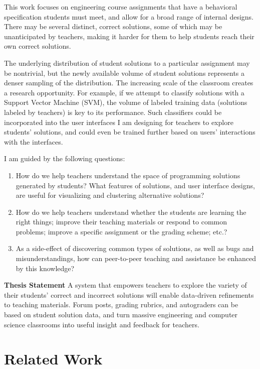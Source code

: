 \documentclass{sigchi}
\begin{document}
This work focuses on engineering course assignments that have a behavioral specification students must meet, and allow for a broad range of internal designs. There may be several distinct, correct solutions, some of which may be unanticipated by teachers, making it harder for them to help students reach their own correct solutions. 

The underlying distribution of student solutions to a particular assignment may be nontrivial, but the newly available volume of student solutions represents a denser sampling of the distribution. The increasing scale of the classroom creates a research opportunity. For example, if we attempt to classify solutions with a Support Vector Machine (SVM), the volume of labeled training data (solutions labeled by teachers) is key to its performance. Such classifiers could be incorporated into the user interfaces I am designing for teachers to explore students’ solutions, and could even be trained further based on users’ interactions with the interfaces. 

I am guided by the following questions:
\begin{enumerate}
\item How do we help teachers understand the space of programming solutions generated by students? What features of solutions, and user interface designs, are useful for visualizing and clustering alternative solutions?
\item How do we help teachers understand whether the students are learning the right things; improve their teaching materials or respond to common problems; improve a specific assignment or the grading scheme; etc.?
\item As a side-effect of discovering common types of solutions, as well as bugs and misunderstandings, how can peer-to-peer teaching and assistance be enhanced by this knowledge?
\end{enumerate}

{\bf Thesis Statement} A system that empowers teachers to explore the variety of their students’ correct and incorrect solutions will enable data-driven refinements to teaching materials. Forum posts, grading rubrics, and autograders can be based on student solution data, and turn massive engineering and computer science classrooms into useful insight and feedback for teachers. 

\section{Related Work}
\end{document}
